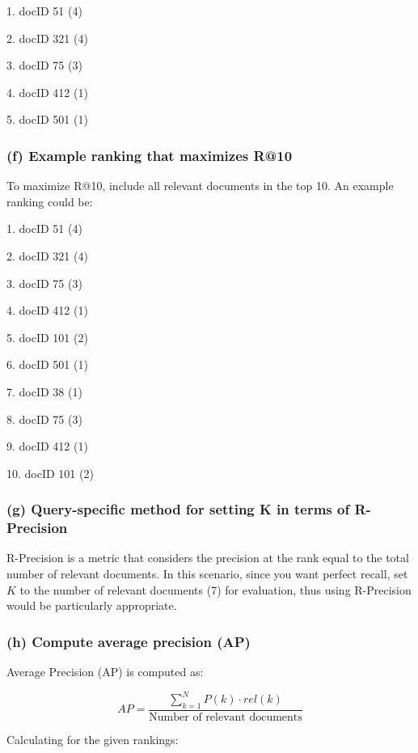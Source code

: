 \documentclass[a4paper, utf8]{ctexart}
\begin{document}
	1. docID 51 (4)  
	
	2. docID 321 (4)  
	
	3. docID 75 (3)  
	
	4. docID 412 (1)  
	
	5. docID 501 (1)  
	
	\subsubsection*{(f) Example ranking that maximizes R@10}
	
	To maximize R@10, include all relevant documents in the top 10. An example ranking could be:
	
	1. docID 51 (4)  
	
	2. docID 321 (4)  
	
	3. docID 75 (3)  
	
	4. docID 412 (1)  
	
	5. docID 101 (2)  
	
	6. docID 501 (1)  
	
	7. docID 38 (1)  
	
	8. docID 75 (3)  
	
	9. docID 412 (1)  
	
	10. docID 101 (2)  
	
	\subsubsection*{(g) Query-specific method for setting K in terms of R-Precision}
	
	R-Precision is a metric that considers the precision at the rank equal to the total number of relevant documents. In this scenario, since you want perfect recall, set \( K \) to the number of relevant documents (7) for evaluation, thus using R-Precision would be particularly appropriate.
	
	\subsubsection*{(h) Compute average precision (AP)}
	
	Average Precision (AP) is computed as:
	
	\[
	AP = \frac{\sum_{k=1}^N P(k) \cdot rel(k)}{\text{Number of relevant documents}}
	\]
	
	Calculating for the given rankings:
	
\end{document}

